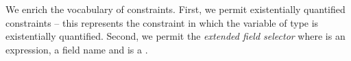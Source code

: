We enrich the vocabulary of constraints. First, we permit
existentially quantified constraints  -- this represents
the constraint  in which the variable  of type
 is existentially quantified. Second, we permit the {\em
  extended field selector}  where  is an
expression,  a field name and  is a . 






